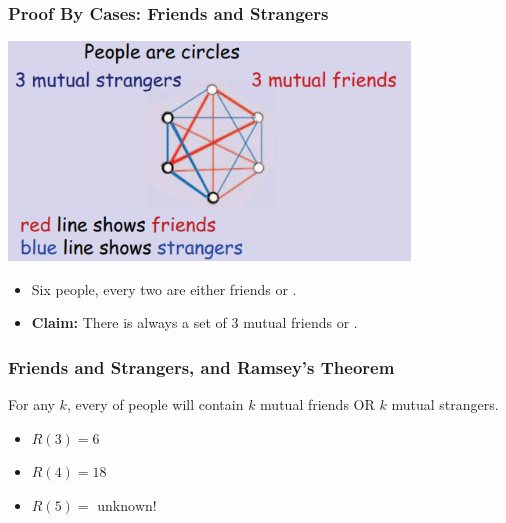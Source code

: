 \begin{frame}
  \frametitle{Proof By Cases: Friends and Strangers}

  \begin{center}
    \includegraphics[width=0.8\textwidth]{../img/friends_and_strangers}
  \end{center}

  \begin{itemize}
  \item Six people, every two are either \alert{friends} or .
  \item {\bf Claim:} There is always a set of \alert{3 mutual
    friends} or .
  \end{itemize}

\end{frame}

\begin{frame}
  \frametitle{Friends and Strangers, and Ramsey's Theorem}

  For any $k$, every  of people
  will contain $k$ mutual friends OR $k$ mutual strangers.

  \bigskip

  \begin{itemize}
  \item $R(3) = 6$
  \item $R(4) = 18$
  \item $R(5) = \text{ unknown!}$
  \end{itemize}
\end{frame}

